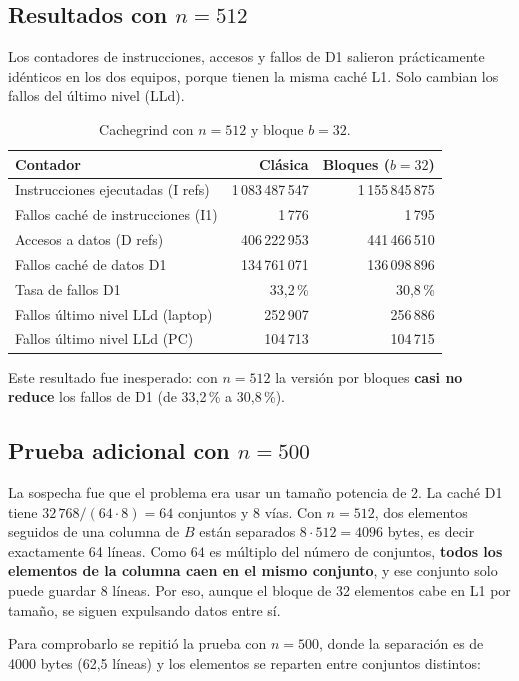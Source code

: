 \documentclass[11pt]{article}
\begin{document}
\subsection{Resultados con $n=512$}

Los contadores de instrucciones, accesos y fallos de D1 salieron
prácticamente idénticos en los dos equipos, porque tienen la misma caché L1.
Solo cambian los fallos del último nivel (LLd).

\begin{table}[H]
\centering
\caption{Cachegrind con $n=512$ y bloque $b=32$.}
\label{tab:cg512}
\begin{tabular}{lrr}
\toprule
Contador & Clásica & Bloques ($b=32$) \\
\midrule
Instrucciones ejecutadas (I refs) & 1\,083\,487\,547 & 1\,155\,845\,875 \\
Fallos caché de instrucciones (I1) & 1\,776 & 1\,795 \\
Accesos a datos (D refs) & 406\,222\,953 & 441\,466\,510 \\
Fallos caché de datos D1 & 134\,761\,071 & 136\,098\,896 \\
Tasa de fallos D1 & 33,2\,\% & 30,8\,\% \\
Fallos último nivel LLd (laptop) & 252\,907 & 256\,886 \\
Fallos último nivel LLd (PC) & 104\,713 & 104\,715 \\
\bottomrule
\end{tabular}
\end{table}

Este resultado fue inesperado: con $n=512$ la versión por bloques
\textbf{casi no reduce} los fallos de D1 (de 33,2\,\% a 30,8\,\%).

\subsection{Prueba adicional con $n=500$}

La sospecha fue que el problema era usar un tamaño potencia de 2. La caché
D1 tiene $32\,768 / (64 \cdot 8) = 64$ conjuntos y 8 vías. Con $n=512$, dos
elementos seguidos de una columna de $B$ están separados $8 \cdot 512 = 4096$
bytes, es decir exactamente 64 líneas. Como $64$ es múltiplo del número de
conjuntos, \textbf{todos los elementos de la columna caen en el mismo
conjunto}, y ese conjunto solo puede guardar 8 líneas. Por eso, aunque el
bloque de 32 elementos cabe en L1 por tamaño, se siguen expulsando datos
entre sí.

Para comprobarlo se repitió la prueba con $n=500$, donde la separación es
de 4000 bytes (62,5 líneas) y los elementos se reparten entre conjuntos
distintos:
\end{document}
